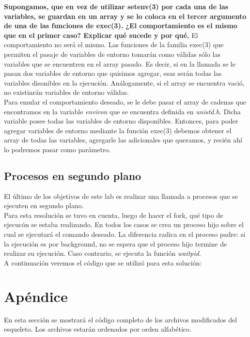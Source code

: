 \documentclass[a4paper, 12pt]{article}
\begin{document}
		\textbf{Supongamos, que en vez de utilizar setenv(3) por cada una de las variables, se guardan en un array y se lo coloca en el tercer argumento de una de las funciones de exec(3). ¿El comportamiento es el mismo que en el primer caso? Explicar qué sucede y por qué.} El comportamiento no será el mismo. Las funciones de la familia exec(3) que permiten el pasaje de variables de entorno tomarán como válidas sólo las variables que se encuentren en el array pasado. Es decir, si en la llamada se le pasan dos variables de entorno que quisimos agregar, esas serán todas las variables disonibles en la ejecución. Análogamente, si el array se encuentra vació, no existinrán variables de entorno válidas.\\
		Para emular el comportamiento deseado, se le debe pasar el array de cadenas que encontramos en la variable \textit{environ} que se encuentra definida en \textit{unistd.h}. Dicha variable posee todas las variables de entorno disponibles. Entonces, para poder agregar variables de entorno mediante la función exec(3) debemos obtener el array de todas las variables, agregarle las adicionales que queramos, y recién ahí lo podremos pasar como parámetro.
	
		\subsection{Procesos en segundo plano}
		El último de los objetivos de este lab es realizar una llamada a procesos que se ejecuten en segundo plano. \\
		
		Para esta resolución se tuvo en cuenta, luego de hacer el fork, qué tipo de ejecucón se estaba realizando. En todos los casos se crea un proceso hijo sobre el cual se ejecutará el comando deseado. La diferencia radica en el proceso padre: si la ejecución es por background, no se espera que el proceso hijo termine de realizar su ejecución. Caso contrario, se ejecuta la función \textit{waitpid}.\\
		
		A continuación veremos el código que se utilizó para esta solución: \\
		
		\bigskip\bigskip\bigskip
		
		
	\newpage
	\section{Apéndice}
	En esta sección se mostrará el código completo de los archivos modificados del esqueleto. Los archivos estarán ordenados por orden alfabético.\\
	
	
	\bigskip\bigskip\bigskip
	
	\bigskip\bigskip\bigskip
	
	
	
			
\end{document}
